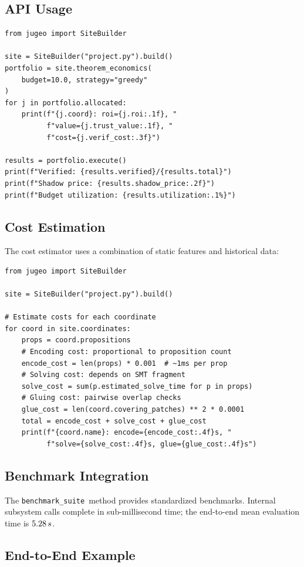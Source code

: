 \documentclass[11pt]{article}
\newcommand{\BenchSuite}{\texttt{benchmark\_suite}}
\begin{document}
\subsection{API Usage}
\begin{lstlisting}[style=jugeo-python]
from jugeo import SiteBuilder

site = SiteBuilder("project.py").build()
portfolio = site.theorem_economics(
    budget=10.0, strategy="greedy"
)
for j in portfolio.allocated:
    print(f"{j.coord}: roi={j.roi:.1f}, "
          f"value={j.trust_value:.1f}, "
          f"cost={j.verif_cost:.3f}")

results = portfolio.execute()
print(f"Verified: {results.verified}/{results.total}")
print(f"Shadow price: {results.shadow_price:.2f}")
print(f"Budget utilization: {results.utilization:.1%}")
\end{lstlisting}

\subsection{Cost Estimation}

The cost estimator uses a combination of static features and
historical data:

\begin{lstlisting}[style=jugeo-python]
from jugeo import SiteBuilder

site = SiteBuilder("project.py").build()

# Estimate costs for each coordinate
for coord in site.coordinates:
    props = coord.propositions
    # Encoding cost: proportional to proposition count
    encode_cost = len(props) * 0.001  # ~1ms per prop
    # Solving cost: depends on SMT fragment
    solve_cost = sum(p.estimated_solve_time for p in props)
    # Gluing cost: pairwise overlap checks
    glue_cost = len(coord.covering_patches) ** 2 * 0.0001
    total = encode_cost + solve_cost + glue_cost
    print(f"{coord.name}: encode={encode_cost:.4f}s, "
          f"solve={solve_cost:.4f}s, glue={glue_cost:.4f}s")
\end{lstlisting}

\subsection{Benchmark Integration}
The \BenchSuite\ method provides standardized benchmarks.
Internal subsystem calls complete in sub-millisecond time;
the end-to-end mean evaluation time is $5.28\,s$.

\subsection{End-to-End Example}
\end{document}
